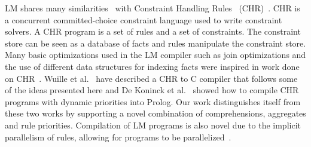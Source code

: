 
LM shares many similarities~\cite{Betz:2005kx} with Constraint Handling Rules~
(CHR)~\cite{chr}.  CHR is a concurrent committed-choice constraint language used
to write constraint solvers. A CHR program is a set of rules and a set of
constraints.  The constraint store can be seen as a database of facts and rules
manipulate the constraint store. Many basic optimizations used in the LM
compiler such as join optimizations and the use of different data structures for
indexing facts were inspired in work done on
CHR~\cite{DBLP:journals/corr/cs-PL-0408025}.  Wuille et al.~\cite{42866} have
described a CHR to C compiler that follows some of the ideas presented here and
De Koninck et al.~\cite{chrp} showed how to compile CHR programs with dynamic
priorities into Prolog. Our work distinguishes itself from these two works by
supporting a novel combination of comprehensions, aggregates and rule
priorities. Compilation of LM programs is also novel due to the implicit
parallelism of rules, allowing for programs to be
parallelized~\cite{cruz-iclp14}.
